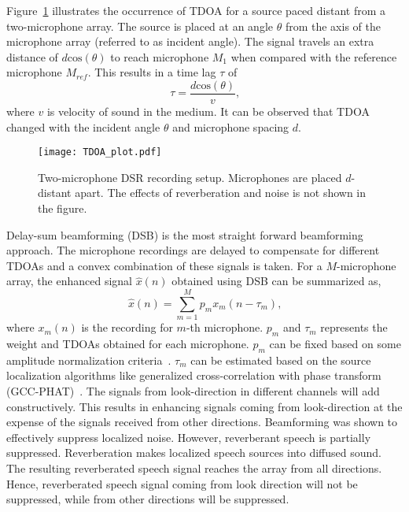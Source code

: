 Figure~\ref{fig:TDOA} illustrates the occurrence of TDOA for a source paced distant from a two-microphone array. 
The source is placed at an angle $\theta$ from the axis of the microphone array (referred to as incident angle). The signal travels an extra distance of $d\text{cos}(\theta)$ to reach microphone $M_1$ when compared with the reference microphone $M_{ref}$. This results in a time lag $\tau$ of
\begin{equation}
\tau = \dfrac{d \text{cos}(\theta)}{v}\text{,}
\end{equation}
where $v$ is velocity of sound in the medium. It can be observed that TDOA changed with the incident angle $\theta$ and microphone spacing $d$. 
\begin{figure}
\centering
\texttt{[image: TDOA\_plot.pdf]}
\caption{ Two-microphone DSR recording setup. Microphones are placed $d$-distant apart. The effects of reverberation and noise is not shown in the figure.}
\label{fig:TDOA}
\end{figure}

Delay-sum beamforming (DSB) is the most straight forward beamforming approach. The microphone recordings are delayed to compensate for different TDOAs and a convex combination of these signals is taken. For a $M$-microphone array, the enhanced signal $\hat{x}(n)$ obtained using DSB can be summarized as,
\begin{equation}
\hat{x}(n)=\sum_{m=1}^M p_m x_m(n-\tau_m) \text{,}
\end{equation}
where $x_m(n)$ is the recording for $m$-th microphone. $p_m$ and $\tau_m$ represents the weight and TDOAs obtained for each microphone. $p_m$ can be fixed based on some amplitude normalization criteria~\cite{anguera2007acoustic}. $\tau_m$ can be estimated based on the source localization algorithms like generalized cross-correlation with phase transform (GCC-PHAT)~\cite{knapp1976generalized}. The signals from look-direction in different channels will add constructively. This results in enhancing signals coming from look-direction at the expense of the signals received from other directions.  Beamforming was shown to effectively suppress localized noise. However, reverberant speech is partially suppressed. Reverberation makes localized speech sources into diffused sound. The resulting reverberated speech signal reaches the array from all directions. Hence, reverberated speech signal coming from look direction will not be suppressed, while from other directions will be suppressed. 
 

